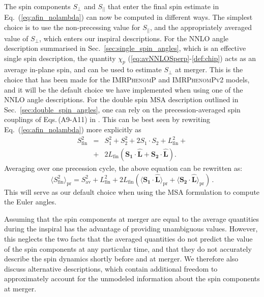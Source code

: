 \documentclass[%
aps,
prd,
amssymb,
amsmath,
amsfonts,
eqsecnum,
showpacs,
nofootinbib,
floatfix,
twocolumn,
twoside,
a4paper,
superscriptaddress
]{revtex4-1}
\newcommand{\ppvtwo}{\textsc{IMRPhenomPv2}\xspace}
\newcommand{\phP}{\textsc{IMRPhenomP}\xspace}
\begin{document}
The spin components $S_\perp$ and $S_{\vert\vert}$ that enter the final spin estimate in Eq.~(\ref{eq:afin_nolambda}) can now be computed in different ways.
The simplest choice is to use the non-precessing value for $S_{\vert\vert}$, and the appropriately averaged value of $S_\perp$, which enters our inspiral descriptions. For the NNLO angle description summarised in Sec.~\ref{sec:single_spin_angles}, which is an effective single spin description, the quantity $\chi_p$ (\ref{eq:avNNLOSperp}-\ref{def:chip}) acts as an average in-plane spin, and can be used to 
estimate $S_{\perp}$ at merger.
This is the choice that has been made for the \phP \cite{Hannam:2013oca}
and \ppvtwo \cite{Bohe:PPv2} models, and it will be the default choice we have implemented when using one of the NNLO angle descriptions.
For the double spin MSA description outlined in Sec.~\ref{sec:double_spin_angles}, one can rely on the precession-averaged spin couplings of Eqs.\,(A9-A11) in \cite{Chatziioannou:2017tdw}. This can be best seen by rewriting Eq.~(\ref{eq:afin_nolambda}) more explicitly as
\begin{eqnarray}
    \label{eq:afin_nolambda_doubleSpin}
S_\mathrm{fin}^2 &=& S_{1}^2+S_{2}^2
 + 2 S_{1}\cdot S_{2} +  L_\mathrm{fin}^2 +\nonumber\\
 &+&2 L_\mathrm{fin} \left(\mathbf{S_{1}}\cdot \mathbf{\hat L}+\mathbf{S_{2}}\cdot \mathbf{\hat L} \right).
\end{eqnarray}
Averaging over one precession cycle, the above equation can be rewritten as: 
\begin{equation}\label{eq:MSA_finalSpin}
\langle S_\mathrm{fin}^2 \rangle_\mathrm{pr}=S^{2}_\mathrm{av}+ L_\mathrm{fin}^2+2 L_\mathrm{fin}(\langle\mathbf{S_{1}}\cdot \mathbf{\hat L}\rangle_\mathrm{pr}+\langle\mathbf{S_{2}}\cdot \mathbf{\hat L}\rangle_\mathrm{pr} ) \,.
\end{equation}
This will serve as our default choice when using the MSA formulation to compute the Euler angles.

Assuming that the spin components at merger are equal to the average quantities during the inspiral has the advantage of providing unambiguous values.
However, this neglects the two facts that the averaged quantities do not predict the value of the spin components at any particular time, and that they do not accurately describe the spin dynamics shortly before and at merger.
%
We therefore also discuss alternative descriptions, which contain additional freedom to approximately account for the unmodeled information about the spin components at merger.
\end{document}
